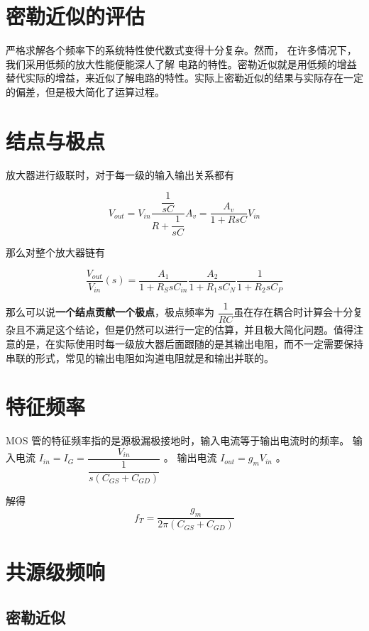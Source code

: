 \documentclass[cn,11pt,chinese,black,simple]{../elegantbook}
\begin{document}
\section{密勒近似的评估}

严格求解各个频率下的系统特性使代数式变得十分复杂。然而， 在许多情况下， 我们采用低频的放大性能便能深人了解
电路的特性。密勒近似就是用低频的增益替代实际的增益，来近似了解电路的特性。实际上密勒近似的结果与实际存在一定的偏差，但是极大简化了运算过程。


\section{结点与极点}

放大器进行级联时，对于每一级的输入输出关系都有 

\[V_{out} = V_{in} \frac{\dfrac{1}{sC}}{R + \dfrac{1}{sC}} A_v = \frac{A_v}{1 + R s C}V_{in} \]

那么对整个放大器链有

\[\frac{V_{out}}{V_{in}}(s) =  \frac{A_1}{1 + R_S s C_{in}} \frac{A_2}{1 + R_1 s C_N}  \frac{1}{1 + R_2 s C_P} \]

那么可以说\textbf{一个结点贡献一个极点}，极点频率为 \(\dfrac{1}{RC}\)虽在存在耦合时计算会十分复杂且不满足这个结论，但是仍然可以进行一定的估算，并且极大简化问题。值得注意的是，在实际使用时每一级放大器后面跟随的是其输出电阻，而不一定需要保持串联的形式，常见的输出电阻如沟道电阻就是和输出并联的。






\section{特征频率}

MOS 管的特征频率指的是源极漏极接地时，输入电流等于输出电流时的频率。
输入电流 \(I_{in} = I_G = \dfrac{V_{in}}{\dfrac{1}{s (C_{GS} + C_{GD})}}\) 。
输出电流 \(I_{out} = g_m V_{in}\) 。

解得 \[f_T = \frac{g_m}{2 \pi (C_{GS} + C_{GD})}\]



\section{共源级频响}

\subsection{密勒近似}
\end{document}
